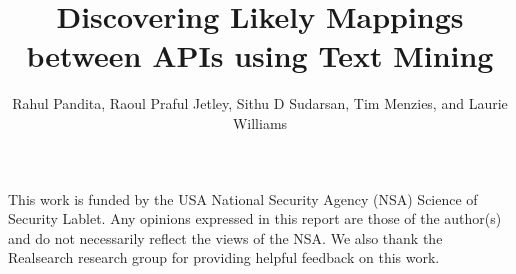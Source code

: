 \documentclass[times]{smrauth}
\begin{document}

\title{Discovering Likely Mappings between APIs using Text Mining}

\author{Rahul Pandita, Raoul Praful Jetley, Sithu D Sudarsan, Tim Menzies, and Laurie Williams}

\address{North Carolina State University, Raleigh, NC, USA \break
{} ABB Corporate Research, Bangalore, India} 


\newcommand{\tool}{{\sc TMAP}}




\maketitle













\ack 
This work is funded by the USA National Security Agency (NSA)
Science of Security Lablet.
Any opinions expressed in this report are those of the author(s) and do not necessarily reflect the views of the NSA. We also thank the Realsearch research group for providing helpful feedback on this work.



\end{document}
